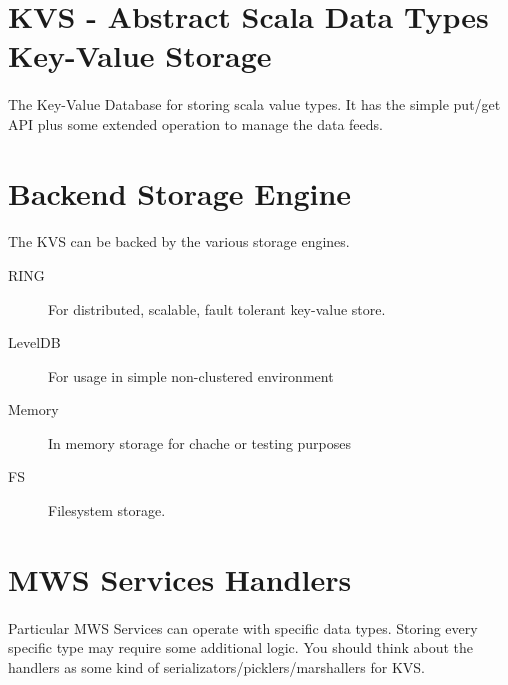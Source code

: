 \section*{KVS - Abstract Scala Data Types Key-Value Storage}
\paragraph{}
The Key-Value Database for storing scala value types. It has the simple put/get API plus some extended operation to manage the data feeds.

\section*{Backend Storage Engine}
\paragraph{}
The KVS can be backed by the various storage engines.
\begin{description}
\item[RING] For distributed, scalable, fault tolerant key-value store.
\item[LevelDB] For usage in simple non-clustered environment
\item[Memory] In memory storage for chache or testing purposes
\item[FS] Filesystem storage.
\end{description}

\section{MWS Services Handlers}
\paragraph{}
Particular MWS Services can operate with specific data types. Storing every specific type may require some additional logic.
You should think about the handlers as some kind of serializators/picklers/marshallers for KVS.
